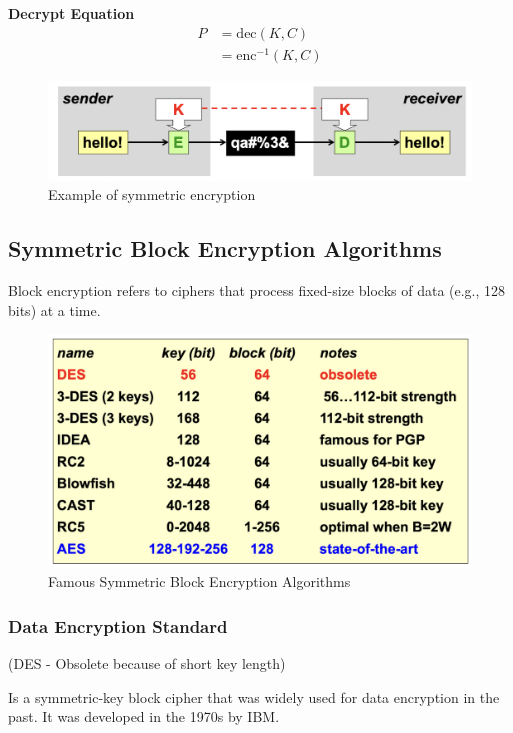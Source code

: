 \textbf{Decrypt Equation}
\begin{equation*}
    \begin{aligned}
        P &= \text{dec}(K, C) \\
          &= \text{enc}^{-1}(K, C)
    \end{aligned}
\end{equation*}
\begin{figure}[H]
    \includegraphics[width=\linewidth]{Images/Cryptography/symmCrypto.png}
    \caption{Example of symmetric encryption}
\end{figure}

\subsection{Symmetric Block Encryption Algorithms}
Block encryption refers to ciphers that process fixed-size blocks of data (e.g., 128 bits) at a time.

\begin{figure}[H]
    \includegraphics[width=\linewidth]{Images/Cryptography/blockSymm.png}
    \caption{Famous Symmetric Block Encryption Algorithms}
\end{figure}


\subsubsection{Data Encryption Standard}
\begin{center}
    (DES - Obsolete because of short key length)
\end{center}
Is a symmetric-key block cipher that was widely used for data encryption in the past. It was developed in the 1970s by IBM.

